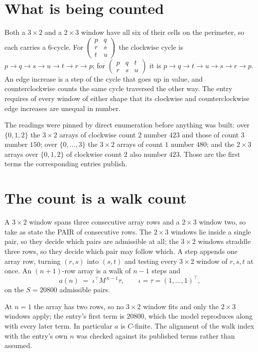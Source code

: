 \documentclass[11pt,a4paper]{article}
\theoremstyle{plain}
\theoremstyle{definition}
\begin{document}
\section{What is being counted}

Both a $3\times2$ and a $2\times3$ window have all six of their cells on the
perimeter, so each carries a $6$-cycle. For
$\begin{pmatrix}p&q\\r&s\\t&u\end{pmatrix}$ the clockwise cycle is
$p\to q\to s\to u\to t\to r\to p$; for
$\begin{pmatrix}p&q&t\\r&s&u\end{pmatrix}$ it is
$p\to q\to t\to u\to s\to r\to p$. An edge increase is a step of the cycle that goes up in
value, and counterclockwise counts the same cycle traversed the other way. The entry requires
of every window of either shape that its clockwise and counterclockwise edge increases are unequal in number.

The readings were pinned by direct enumeration before anything was built: over
$\{0,1,2\}$ the $3\times2$ arrays of clockwise count $2$ number $423$ and those of count
$3$ number $150$; over $\{0,\dots,3\}$ the $3\times2$ arrays of count $1$ number $480$;
and the $2\times3$ arrays over $\{0,1,2\}$ of clockwise count $2$ also number $423$. Those
are the first terms the corresponding entries publish.

\section{The count is a walk count}

A $3\times2$ window spans three consecutive array rows and a $2\times3$
window two, so take as state the PAIR of consecutive rows. The $2\times3$ windows lie inside a
single pair, so they decide which pairs are admissible at all; the $3\times2$ windows straddle
three rows, so they decide which pair may follow which. A step appends one array row, turning
$(r,s)$ into $(s,t)$ and testing every $3\times2$ window of $r,s,t$ at once. An $(n+1)$-row
array is a walk of $n-1$ steps and
\[
a(n)\;=\;\iota^{\!\top}M^{\,n-1}\tau,\qquad\iota=\tau=(1,\dots,1)^{\!\top},
\]
on the $S=20800$ admissible pairs.

At $n=1$ the array has two rows, so no $3\times2$ window fits and only the
$2\times3$ windows apply; the entry's first term is
$20800$, which the model reproduces along with every later term.
In particular $a$ is $C$-finite. The alignment of the walk index with the entry's own $n$ was
checked against its published terms rather than assumed.
\end{document}
